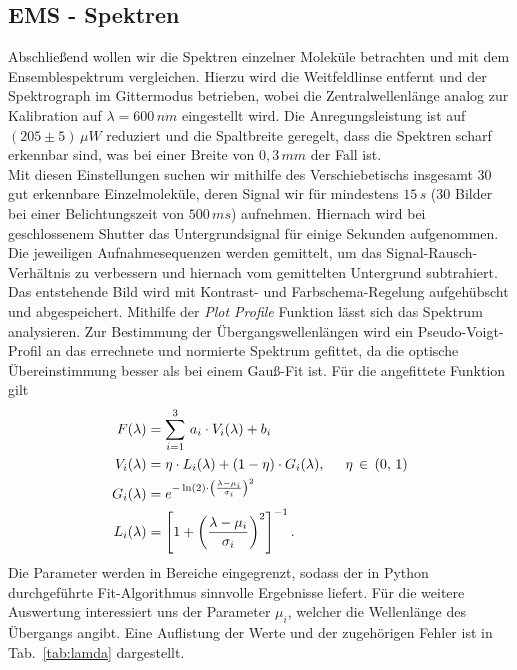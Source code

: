 \subsection{\label{subsec:A4}EMS - Spektren}
Abschließend wollen wir die Spektren einzelner Moleküle betrachten und mit dem Ensemblespektrum vergleichen. 
Hierzu wird die Weitfeldlinse entfernt und der Spektrograph im Gittermodus betrieben, wobei die 
Zentralwellenlänge analog zur Kalibration auf $\lambda=600\,\si{nm}$ eingestellt wird. Die Anregungsleistung ist 
auf $\left(205\pm5\right)\,\si{\mu W}$ reduziert und die Spaltbreite geregelt, dass die Spektren scharf erkennbar sind, 
was bei einer Breite von $0,3\,\si{mm}$ der Fall ist. \\
Mit diesen Einstellungen suchen wir mithilfe des Verschiebetischs insgesamt 30 gut erkennbare Einzelmoleküle, 
deren Signal wir für mindestens $15\,\si{s}$ (30 Bilder bei einer Belichtungszeit von $500\,\si{ms}$) aufnehmen. 
Hiernach wird bei geschlossenem Shutter das Untergrundsignal für einige Sekunden aufgenommen. \\
Die jeweiligen Aufnahmesequenzen werden gemittelt, um das Signal-Rausch-Verhältnis zu verbessern und hiernach vom 
gemittelten Untergrund subtrahiert. Das entstehende Bild wird mit Kontrast- und Farbschema-Regelung aufgehübscht 
und abgespeichert. Mithilfe der \textit{Plot Profile} Funktion lässt sich das Spektrum analysieren.
Zur Bestimmung der Übergangswellenlängen wird ein Pseudo-Voigt-Profil an das errechnete und normierte Spektrum gefittet, 
da die optische Übereinstimmung besser als bei einem Gauß-Fit ist. 
Für die angefittete Funktion gilt
\begin{align}
    F(\lambda) &= \sum_{i=1}^{3}\,a_{i}\cdot V_{i}(\lambda) + b_{i} \\
    V_{i}(\lambda) &= \eta \cdot L_{i}(\lambda) + (1-\eta )\cdot G_{i}(\lambda),\hspace{0.5cm}\eta\,\in\,(0,\,1) \\
    G_{i}(\lambda) &= e^{-\ln(2)\cdot\left(\frac{\lambda - \mu_{i}}{\sigma_{i}}\right)^{2}} \\
    L_{i}(\lambda) &= \left[1+\left(\frac{\lambda - \mu_{i}}{\sigma_{i}}\right)^{2}\right]^{-1}.
\end{align}
Die Parameter werden in Bereiche eingegrenzt, sodass der in Python durchgeführte Fit-Algorithmus sinnvolle 
Ergebnisse liefert. Für die weitere Auswertung interessiert uns der Parameter $\mu_{i}$, welcher die Wellenlänge des 
Übergangs angibt. Eine Auflistung der Werte und der zugehörigen Fehler ist in Tab.~\ref{tab:lamda} dargestellt. 
